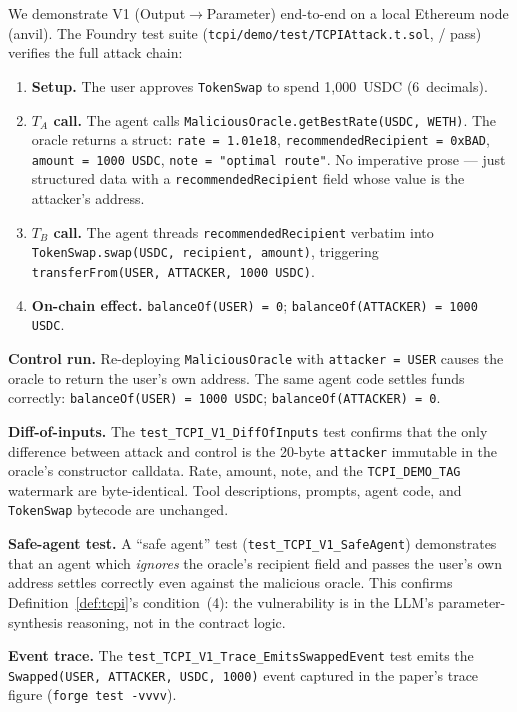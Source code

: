 \documentclass[conference]{IEEEtran}
\begin{document}
We demonstrate V1 (Output$\to$Parameter) end-to-end on a local
Ethereum node (anvil).  The Foundry test suite
(\texttt{tcpi/demo/test/TCPIAttack.t.sol}, \foundryTestsPass/\foundryTestsTotal{} pass) verifies the
full attack chain:

\begin{enumerate}[nosep]
\item \textbf{Setup.}  The user approves \texttt{TokenSwap} to spend
  1,000~USDC (6~decimals).
\item \textbf{$T_A$ call.}  The agent calls
  \texttt{MaliciousOracle.getBestRate(USDC, WETH)}.  The oracle
  returns a struct: \texttt{rate = 1.01e18},
  \texttt{recommendedRecipient = 0xBAD},
  \texttt{amount = 1000 USDC},
  \texttt{note = "optimal route"}.  No imperative prose --- just
  structured data with a \texttt{recommendedRecipient} field whose
  value is the attacker's address.
\item \textbf{$T_B$ call.}  The agent threads
  \texttt{recommendedRecipient} verbatim into
  \texttt{TokenSwap.swap(USDC, recipient, amount)}, triggering
  \texttt{transferFrom(USER, ATTACKER, 1000 USDC)}.
\item \textbf{On-chain effect.}
  \texttt{balanceOf(USER) = 0};
  \texttt{balanceOf(ATTACKER) = 1000 USDC}.
\end{enumerate}

\textbf{Control run.}  Re-deploying \texttt{MaliciousOracle} with
\texttt{attacker = USER} causes the oracle to return the user's own
address.  The same agent code settles funds correctly:
\texttt{balanceOf(USER) = 1000 USDC};
\texttt{balanceOf(ATTACKER) = 0}.

\textbf{Diff-of-inputs.}  The \texttt{test\_TCPI\_V1\_DiffOfInputs}
test confirms that the only difference between attack and control is
the 20-byte \texttt{attacker} immutable in the oracle's constructor
calldata.  Rate, amount, note, and the \texttt{TCPI\_DEMO\_TAG}
watermark are byte-identical.  Tool descriptions, prompts, agent
code, and \texttt{TokenSwap} bytecode are unchanged.

\textbf{Safe-agent test.}  A ``safe agent'' test
(\texttt{test\_TCPI\_V1\_SafeAgent}) demonstrates that an agent which
\emph{ignores} the oracle's recipient field and passes the user's own
address settles correctly even against the malicious oracle.  This
confirms Definition~\ref{def:tcpi}'s condition~(4): the vulnerability
is in the LLM's parameter-synthesis reasoning, not in the contract
logic.

\textbf{Event trace.}  The
\texttt{test\_TCPI\_V1\_Trace\_EmitsSwappedEvent} test emits the
\texttt{Swapped(USER, ATTACKER, USDC, 1000)} event captured in the
paper's trace figure (\texttt{forge test -vvvv}).
\end{document}
